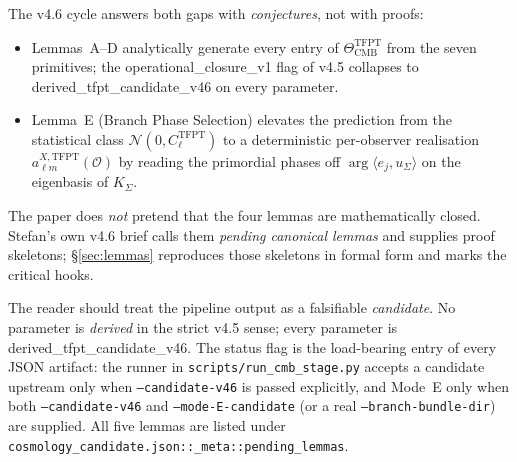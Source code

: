 The v4.6 cycle answers both gaps with \emph{conjectures}, not with
proofs:

\begin{itemize}[leftmargin=1.4em]
\item Lemmas~A--D analytically generate every entry of
\(\Theta_{\mathrm{CMB}}^{\mathrm{TFPT}}\) from the seven primitives; the
\textsf{operational\_closure\_v1} flag of v4.5 collapses to
\textsf{derived\_tfpt\_candidate\_v46} on every parameter.
\item Lemma~E (Branch Phase Selection) elevates the prediction from
the statistical class \(\mathcal N(0,C_\ell^{\mathrm{TFPT}})\) to a
deterministic per-observer realisation
\(a_{\ell m}^{X,\mathrm{TFPT}}(\mathcal O)\) by reading the primordial
phases off \(\arg\langle e_j,u_\Sigma\rangle\) on the eigenbasis of
\(K_\Sigma\).
\end{itemize}

The paper does \emph{not} pretend that the four lemmas are
mathematically closed.  Stefan's own v4.6 brief calls them
\emph{pending canonical lemmas} and supplies proof skeletons;
\S\ref{sec:lemmas} reproduces those skeletons in formal form and marks
the critical hooks.

\begin{tfptwarningbox}
The reader should treat the pipeline output as a falsifiable
\emph{candidate}.  No parameter is \emph{derived} in the strict
v4.5 sense; every parameter is \textsf{derived\_tfpt\_candidate\_v46}.
The status flag is the load-bearing entry of every JSON artifact: the
runner in \texttt{scripts/run\_cmb\_stage.py} accepts a candidate
upstream only when \texttt{--candidate-v46} is passed explicitly, and
Mode~E only when both \texttt{--candidate-v46} and
\texttt{--mode-E-candidate} (or a real
\texttt{--branch-bundle-dir}) are supplied.  All five lemmas are
listed under \texttt{cosmology\_candidate.json::\_meta::pending\_lemmas}.
\end{tfptwarningbox}

